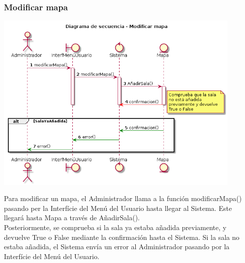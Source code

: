 \subsubsection{Modificar mapa}
\begin{center}
  \includegraphics[width=0.9\textwidth]{./imatges/administrador/Modificar_mapa.png}
  \end{center}
  Para modificar un mapa, el Administrador llama a la función modificarMapa() pasando per la Interfície del Menú del Usuario hasta llegar al Sistema. Este llegará hasta Mapa a través de AñadirSala().
  \\Posteriormente, se comprueba si la sala ya estaba añadida previamente, y devuelve True o False mediante la confirmación hasta el Sistema. Si la sala no estaba añadida, el Sistema envía un error al Administrador pasando por la Interfície del Menú del Usuario.
  
